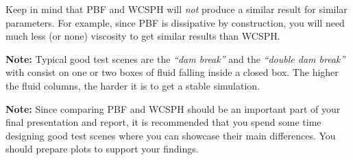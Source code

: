 \documentclass[11pt,a4paper,onesided]{vci_anim_exercise}
\begin{document}
Keep in mind that PBF and WCSPH will \emph{not} produce a similar result for similar parameters. For example, since PBF is dissipative by construction, you will need much less (or none) viscosity to get similar results than WCSPH.

\textbf{Note:} Typical good test scenes are the \textit{``dam break''} and the \textit{``double dam break''} with consist on one or two boxes of fluid falling inside a closed box. The higher the fluid columns, the harder it is to get a stable simulation.

\textbf{Note:} Since comparing PBF and WCSPH should be an important part of your final presentation and report, it is recommended that you spend some time designing good test scenes where you can showcase their main differences. You should prepare plots to support your findings.



\end{document}
